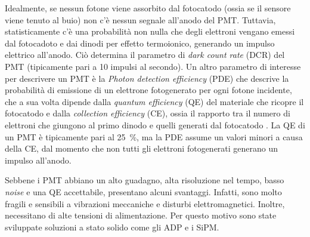 Idealmente, se nessun fotone viene assorbito dal fotocatodo (ossia se il sensore viene tenuto al buio) non c'è nessun segnale all'anodo del PMT. Tuttavia, statisticamente c'è una probabilità non nulla che degli elettroni vengano emessi dal fotocadoto e dai dinodi per effetto termoionico, generando un impulso elettrico all'anodo. Ciò determina il parametro di \textit{dark count rate} (DCR) del PMT (tipicamente pari a 10 impulsi al secondo).
Un altro parametro di interesse per descrivere un PMT è la \textit{Photon detection efficiency} (PDE) che descrive la probabilità di emissione di un elettrone fotogenerato per ogni fotone incidente, che a sua volta dipende dalla \textit{quantum efficiency} (QE) del materiale che ricopre il fotocatodo e dalla \textit{collection efficiency} (CE), ossia il rapporto tra il numero di elettroni che giungono al primo dinodo e quelli generati dal fotocatodo \cite{Hai2018}. La QE di un PMT è tipicamente pari al \SI{25}{\percent}, ma la PDE assume un valori minori a causa della CE, dal momento che non tutti gli elettroni fotogenerati generano un impulso all'anodo.

Sebbene i PMT abbiano un alto guadagno, alta risoluzione nel tempo, basso \textit{noise} e una QE accettabile, presentano alcuni svantaggi. Infatti, sono molto fragili e sensibili a vibrazioni meccaniche e disturbi elettromagnetici. Inoltre, necessitano di alte tensioni di alimentazione. Per questo motivo sono state sviluppate soluzioni a stato solido come gli ADP e i SiPM.

\clearpage
